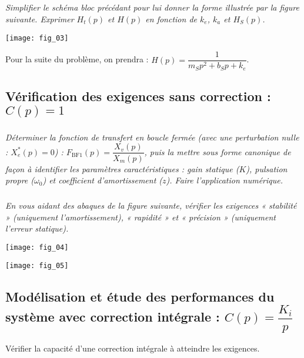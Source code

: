\begin{multicols}{2}
\subparagraph{}\textit{Simplifier le schéma bloc précédant pour lui donner la forme illustrée par la figure suivante.
Exprimer $H_t(p)$ et $H(p)$ en fonction de $k_e$, $k_a$ et $H_S(p)$.}
\ifprof
\begin{corrige}
\end{corrige}
\else
\fi


\begin{center}
\texttt{[image: fig\_03]}
\end{center}

Pour la suite du problème, on prendra : $H(p) = \dfrac{1}{m_S p^2 + b_S p + k_e}$.

\subsection*{Vérification des exigences sans correction : $C(p) = 1$}

\subparagraph{}\textit{Déterminer la fonction de transfert en boucle fermée (avec une perturbation nulle :
$X^{*}_e(p)=0$) : $F_{\text{BF1}}(p) =\dfrac{X_v(p)}{X_m(p)}$, puis la mettre sous forme canonique de façon à identifier les paramètres caractéristiques : gain statique ($K$), pulsation propre ($\omega_0$) et coefficient d’amortissement
($z$). Faire l’application numérique.}
\ifprof
\begin{corrige}
\end{corrige}
\else
\fi

\subparagraph{}\textit{En vous aidant des abaques de la figure suivante, vérifier les exigences « stabilité »
(uniquement l’amortissement), « rapidité » et « précision » (uniquement l’erreur statique).}
\ifprof
\begin{corrige}
\end{corrige}
\else
\fi


\begin{center}
\texttt{[image: fig\_04]}
\end{center}


\begin{center}
\texttt{[image: fig\_05]}
\end{center}

\subsection*{Modélisation et étude des performances du système avec correction intégrale : $C(p) = \dfrac{K_i}{p}$}

\begin{obj}
Vérifier la capacité d’une correction intégrale à atteindre les exigences.
\end{obj}


\end{multicols}
